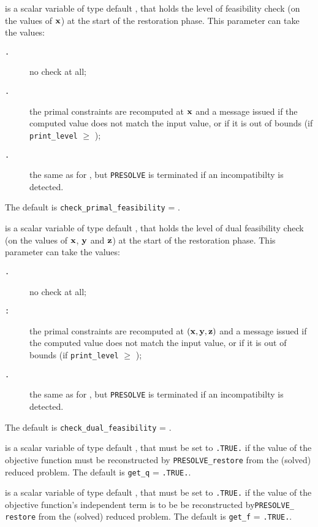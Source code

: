 \documentclass{galahad}
\newcommand{\packagename}{PRESOLVE}
\newcommand{\sym}{\tt\small}
\begin{document}
\begin{description}
 is a scalar variable of type default
\integer, that holds the level of feasibility check (on the values of ${\mathbf{x}}$)
at the start of the restoration phase.  This parameter can
take the values:
\begin{description}
\item[\sym \galsymnone.] no check at all;
\item[\sym \galsymbasic.] the primal constraints are recomputed at ${\mathbf{x}}$
             and a message issued if the computed value
             does not match the input value, or if it is
             out of bounds (if {\tt print\_level} $\geq$ {\sym \galsymaction});
\item[\sym \galsymsevere.] the same as for {\sym \galsymbasic}, but {\tt \packagename} is
              terminated if an incompatibilty is detected.
\end{description}
The default is {\tt check\_primal\_feasibility} = {\sym \galsymnone}.

 is a scalar variable of type default
\integer, that holds the level of dual feasibility check (on the values of
${\mathbf{x}}$, ${\mathbf{y}}$ and ${\mathbf{z}}$) at the start of the restoration phase.  This
parameter can take the values:
\begin{description}
\item[\sym \galsymnone.] no check at all;
\item[\sym \galsymbasic:] the primal constraints are recomputed at $({\mathbf{x}},{\mathbf{y}},{\mathbf{z}})$
             and a message issued if the computed value
             does not match the input value, or if it is
             out of bounds (if {\tt print\_level} $\geq$ {\sym \galsymaction});
\item[\sym \galsymsevere.] the same as for {\sym \galsymbasic}, but {\tt \packagename} is
              terminated if an incompatibilty is detected.
\end{description}
The default is {\tt check\_dual\_feasibility} = {\sym \galsymnone}.

 is a scalar variable of type default \logical, that
must be set to {\tt .TRUE.} if the value of the objective
function must be reconstructed by {\tt \packagename\_restore} from the
(solved) reduced problem. 
The default is {\tt get\_q} = {\tt .TRUE.}.

 is a scalar variable of type default \logical, that
must be set to {\tt .TRUE.} if the value of the objective
function's independent term is to be be reconstructed
by{\tt \packagename\_ restore} from the (solved) reduced problem.
The default is {\tt get\_f} = {\tt .TRUE.}.


\end{description}
\end{document}
